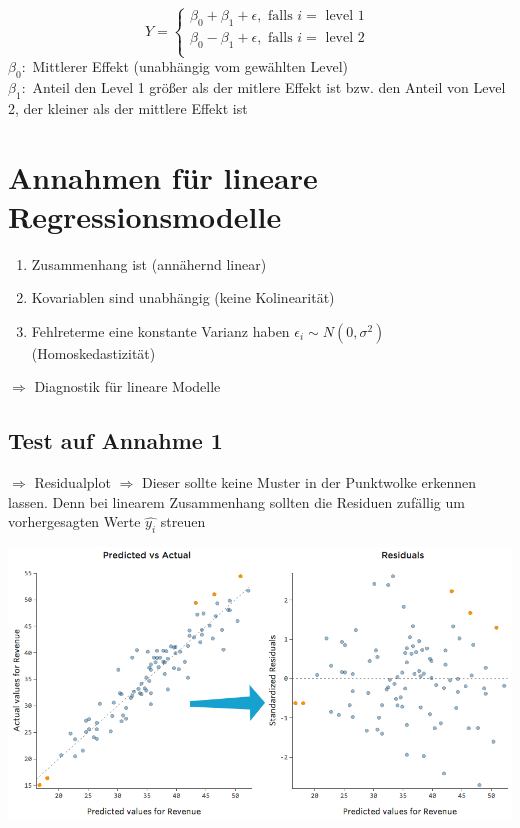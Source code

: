 \documentclass[10pt]{report}
\theoremstyle{definition}
\begin{document}
\[ Y = \begin{cases}
		\beta_0 + \beta_1 + \epsilon, \text{ falls } i = \text{ level 1 } \\
		\beta_0 - \beta_1 + \epsilon, \text{ falls } i = \text{ level 2 } \\
\end{cases} \]
$\beta_0:$ Mittlerer Effekt (unabhängig vom gewählten Level)\\
$\beta_1:$ Anteil den Level 1 größer als der mitlere Effekt ist bzw. den Anteil von Level 2, der kleiner als der mittlere Effekt ist\\

\section{Annahmen für lineare Regressionsmodelle}
\begin{enumerate}
	\item Zusammenhang ist (annähernd linear)
	\item Kovariablen sind unabhängig (keine Kolinearität)
	\item Fehlreterme eine konstante Varianz haben $\epsilon_i \sim N(0, \sigma^{2} )$ (Homoskedastizität)
\end{enumerate}
$\Rightarrow$ Diagnostik für lineare Modelle

\subsection{Test auf Annahme 1}
$\Rightarrow$ Residualplot
$\Rightarrow$ Dieser sollte keine Muster in der Punktwolke erkennen lassen. Denn bei linearem Zusammenhang sollten die Residuen zufällig um vorhergesagten Werte $\hat{y_i}$ streuen

\includegraphics[scale=0.4]{VorlesungenTexDateien/images/residual}
       
\end{document}
